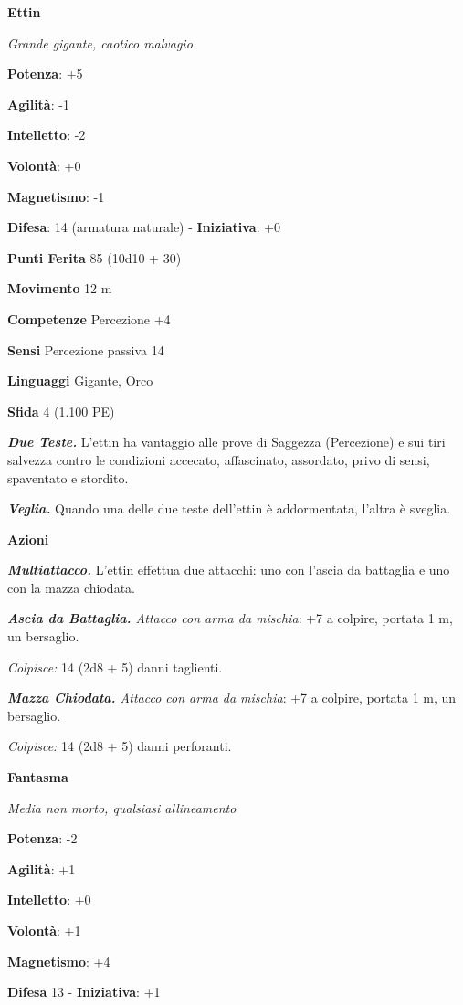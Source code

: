 \begin{multicols}{2}
\textbf{Ettin}

\emph{Grande gigante, caotico malvagio}

\textbf{Potenza}: +5

\textbf{Agilità}: -1

\textbf{Intelletto}: -2

\textbf{Volontà}: +0

\textbf{Magnetismo}: -1

\textbf{Difesa}: 14 (armatura naturale) - \textbf{Iniziativa}: +0

\textbf{Punti Ferita} 85 (10d10 + 30)

\textbf{Movimento} 12 m

\textbf{Competenze} Percezione +4

\textbf{Sensi} Percezione passiva 14

\textbf{Linguaggi} Gigante, Orco

\textbf{Sfida} 4 (1.100 PE)\smallskip

\emph{\textbf{Due Teste.}} L'ettin ha vantaggio alle prove di Saggezza
(Percezione) e sui tiri salvezza contro le condizioni accecato,
affascinato, assordato, privo di sensi, spaventato e stordito.

\emph{\textbf{Veglia.}} Quando una delle due teste dell'ettin è
addormentata, l'altra è sveglia.

\smallskip\textbf{Azioni}

\emph{\textbf{Multiattacco.}} L'ettin effettua due attacchi: uno con
l'ascia da battaglia e uno con la mazza chiodata.

\emph{\textbf{Ascia da Battaglia.} Attacco con arma da mischia}: +7 a
colpire, portata 1 m, un bersaglio.

\emph{Colpisce:} 14 (2d8 + 5) danni taglienti.

\emph{\textbf{Mazza Chiodata.} Attacco con arma da mischia}: +7 a
colpire, portata 1 m, un bersaglio.

\emph{Colpisce:} 14 (2d8 + 5) danni perforanti.

\textbf{Fantasma}

\emph{Media non morto, qualsiasi allineamento}

\textbf{Potenza}: -2

\textbf{Agilità}: +1

\textbf{Intelletto}: +0

\textbf{Volontà}: +1

\textbf{Magnetismo}: +4

\textbf{Difesa} 13 - \textbf{Iniziativa}: +1


\end{multicols}
